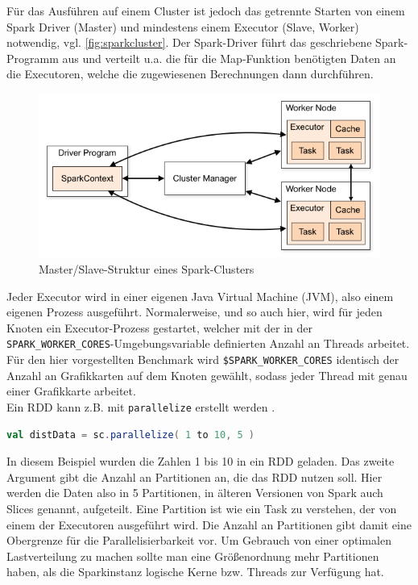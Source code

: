Für das Ausführen auf einem Cluster ist jedoch das getrennte Starten von einem Spark Driver (Master) und mindestens einem Executor (Slave, Worker) notwendig, vgl. \autoref{fig:sparkcluster}.
Der Spark-Driver führt das geschriebene Spark-Programm aus und verteilt u.a. die für die Map-Funktion benötigten Daten an die Executoren, welche die zugewiesenen Berechnungen dann durchführen.

\begin{figure}
    \centerline{\includegraphics[width=0.8\linewidth]{cluster-overview.png}}
    \caption{Master/Slave-Struktur eines Spark-Clusters\cite{spark}}
    \label{fig:sparkcluster}
\end{figure}

Jeder Executor wird in einer eigenen Java Virtual Machine (JVM), also einem eigenen Prozess ausgeführt.
Normalerweise, und so auch hier, wird für jeden Knoten ein Executor-Prozess gestartet, welcher mit der in der \lstinline!SPARK_WORKER_CORES!-Umgebungsvariable definierten Anzahl an Threads arbeitet.
Für den hier vorgestellten Benchmark wird \lstinline!$SPARK_WORKER_CORES! identisch der Anzahl an Grafikkarten auf dem Knoten gewählt, sodass jeder Thread mit genau einer Grafikkarte arbeitet.\\

Ein RDD kann z.B. mit \lstinline!parallelize! erstellt werden \cite{sparkguide}.
\begin{lstlisting}[numbers=none,language=scala]
val distData = sc.parallelize( 1 to 10, 5 )
\end{lstlisting}\vspace{-1.5\baselineskip}
In diesem Beispiel wurden die Zahlen 1 bis 10 in ein RDD geladen.
Das zweite Argument gibt die Anzahl an Partitionen an, die das RDD nutzen soll.
Hier werden die Daten also in 5 Partitionen, in älteren Versionen von Spark auch Slices genannt, aufgeteilt.
Eine Partition ist wie ein Task zu verstehen, der von einem der Executoren ausgeführt wird.
Die Anzahl an Partitionen gibt damit eine Obergrenze für die Parallelisierbarkeit vor.
Um Gebrauch von einer optimalen Lastverteilung zu machen sollte man eine Größenordnung mehr Partitionen haben, als die Sparkinstanz logische Kerne bzw. Threads zur Verfügung hat.


